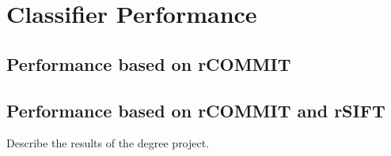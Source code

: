 \section{Classifier Performance}
\subsection{Performance based on rCOMMIT}
\subsection{Performance based on rCOMMIT and rSIFT}
Describe the results of the degree project.
